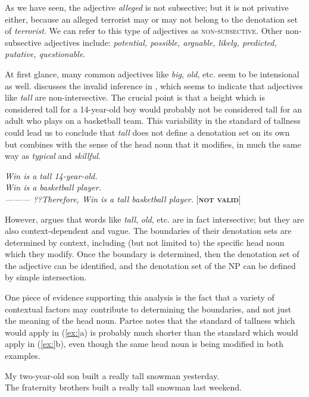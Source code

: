 As we have seen, the adjective \textit{alleged} is not subsective; but it is not privative either, because an alleged terrorist may or may not belong to the denotation set of \textit{terrorist}. We can refer to this type of adjectives as \textsc{non-subsective}. Other non-subsective adjectives include: \textit{potential, possible, arguable, likely, predicted, putative, questionable}.



At first glance, many common adjectives like \textit{big}, \textit{old}, etc. seem to be intensional as well. \citet{Partee1995} discusses the invalid inference in , which seems to indicate that adjectives like \textit{tall} are non-intersective. The crucial point is that a height which is considered tall for a 14-year-old boy would probably not be considered tall for an adult who plays on a basketball team. This variability in the standard of tallness could lead us to conclude that \textit{tall} does not define a denotation set on its own but combines with the sense of the head noun that it modifies, in much the same way as \textit{typical} and \textit{skillful}.


\ea
\textit{Win is a tall 14-year-old.}\\
\textit{Win is a basketball player.\\
———\FelixHRule
??Therefore, Win is a tall basketball player.}   [\textbf{\textsc{not valid}}]
\z


However, \citet{Siegel1976} argues that words like \textit{tall}, \textit{old}, etc. are in fact intersective; but they are also context-dependent and vague. The boundaries of their denotation sets are determined by context, including (but not limited to) the specific head noun which they modify. Once the boundary is determined, then the denotation set of the adjective can be identified, and the denotation set of the NP can be defined by simple intersection.



One piece of evidence supporting this analysis is the fact that a variety of contextual factors may contribute to determining the boundaries, and not just the meaning of the head noun. Partee notes that the standard of tallness which would apply in (\ref{ex:}a) is probably much shorter than the standard which would apply in (\ref{ex:}b), even though the same head noun is being modified in both examples.


\ea
\ea My two-year-old son built a really tall snowman yesterday.\\
\ex The fraternity brothers built a really tall snowman last weekend.
                       \z
\z


